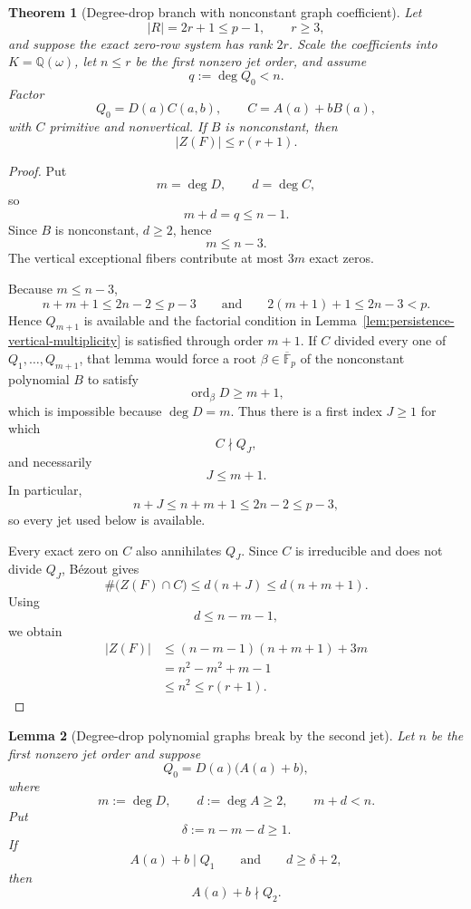 \documentclass[11pt]{article}
\newtheorem{theorem}{Theorem}[section]
\newtheorem{lemma}[theorem]{Lemma}
\newcommand{\F}{\mathbb F}
\newcommand{\Q}{\mathbb Q}
\begin{document}
\begin{theorem}[Degree-drop branch with nonconstant graph coefficient]
\label{thm:degree-drop-nonconstant-B}
Let
\[
 |R|=2r+1\le p-1,\qquad r\ge3,
\]
and suppose the exact zero-row system has rank \(2r\).
Scale the coefficients into \(K=\Q(\omega)\), let \(n\le r\) be the
first nonzero jet order, and assume
\[
 q:=\deg Q_0<n.
\]
Factor
\[
 Q_0=D(a)C(a,b),
 \qquad
 C=A(a)+bB(a),
\]
with \(C\) primitive and nonvertical.  If \(B\) is nonconstant, then
\begin{equation}
 \boxed{|Z(F)|\le r(r+1).}
 \label{eq:degree-drop-nonconstant-B}
\end{equation}
\end{theorem}

\begin{proof}
Put
\[
 m=\deg D,\qquad d=\deg C,
\]
so
\[
 m+d=q\le n-1.
\]
Since \(B\) is nonconstant, \(d\ge2\), hence
\[
 m\le n-3.
\]
The vertical exceptional fibers contribute at most \(3m\) exact
zeros.

Because \(m\le n-3\),
\[
 n+m+1\le2n-2\le p-3
 \qquad\text{and}\qquad
 2(m+1)+1\le2n-3<p.
\]
Hence \(Q_{m+1}\) is available and the factorial condition in
Lemma~\ref{lem:persistence-vertical-multiplicity} is satisfied through order
\(m+1\).  If \(C\) divided every one of
\(Q_1,\ldots,Q_{m+1}\), that lemma would force a root
\(\beta\in\overline{\F}_p\) of the nonconstant polynomial \(B\) to
satisfy
\[
 \operatorname{ord}_\beta D\ge m+1,
\]
which is impossible because \(\deg D=m\).  Thus there is a first index
\(J\ge1\) for which
\[
 C\nmid Q_J,
\]
and necessarily
\[
 J\le m+1.
\]
In particular,
\[
 n+J\le n+m+1\le2n-2\le p-3,
\]
so every jet used below is available.

Every exact zero on \(C\) also annihilates \(Q_J\).
Since \(C\) is irreducible and does not divide \(Q_J\), B\'ezout gives
\[
 \#\bigl(Z(F)\cap C\bigr)
 \le
 d(n+J)
 \le
 d(n+m+1).
\]
Using
\[
 d\le n-m-1,
\]
we obtain
\[
 \begin{aligned}
 |Z(F)|
 &\le
 (n-m-1)(n+m+1)+3m\\
 &=n^2-m^2+m-1\\
 &\le n^2
 \le r(r+1).
 \end{aligned}
\]
\end{proof}




\begin{lemma}[Degree-drop polynomial graphs break by the second jet]
\label{lem:degree-drop-graph-break}
Let \(n\) be the first nonzero jet order and suppose
\[
 Q_0=D(a)\bigl(A(a)+b\bigr),
\]
where
\[
 m:=\deg D,\qquad d:=\deg A\ge2,\qquad
 m+d<n.
\]
Put
\[
 \delta:=n-m-d\ge1.
\]
If
\[
 A(a)+b\mid Q_1
 \qquad\text{and}\qquad
 d\ge\delta+2,
\]
then
\begin{equation}
 \boxed{A(a)+b\nmid Q_2.}
 \label{eq:degree-drop-graph-break}
\end{equation}
\end{lemma}
\end{document}
